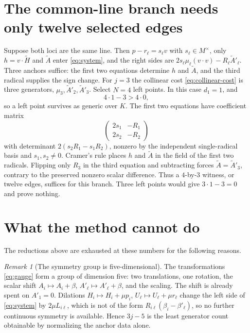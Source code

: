 \documentclass[11pt]{article}
\theoremstyle{remark}
\newtheorem{remark}{Remark}
\begin{document}
\section{The common-line branch needs only twelve selected edges}
\label{sec:common-line}
Suppose both loci are the same line. Then $p-r_\ell=s_\ell v$ with
$s_\ell\in M^\times$, only $h=v\cdot\widetilde H$ and $\widetilde A$
enter \eqref{eq:system}, and the right sides are
$2s_\ell\mu_\ell(v\cdot v)-R_\ell\widetilde A'_\ell$. Three anchors
suffice: the first two equations determine $h$ and $\widetilde A$, and
the third radical supplies the sign change. For $j=3$ the collinear
cost \eqref{eq:collinear-cost} is three generators,
$\mu_3,\widetilde A'_2,\widetilde A'_3$. Select $N=4$ left points. In
this case $d_1=1$, and
\[
 4\cdot1-3>4\cdot0 ,
\]
so a left point survives as generic over $K$. The first two equations
have coefficient matrix
\[
 \begin{pmatrix}2s_1&-R_1\\2s_2&-R_2\end{pmatrix}
\]
with determinant $2(s_2R_1-s_1R_2)$, nonzero by the independent
single-radical basis and $s_1,s_2\ne0$. Cramer's rule places $h$ and
$\widetilde A$ in the field of the first two radicals. Flipping only
$R_3$ in the third equation and subtracting forces
$\widetilde A=\widetilde A'_3$, contrary to the preserved nonzero
scalar difference. Thus a $4$-by-$3$ witness, or twelve edges, suffices
for this branch. Three left points would give $3\cdot1-3=0$ and prove
nothing.

\section{What the method cannot do}
\label{sec:limits}
The reductions above are exhausted at these numbers for the following
reasons.

\begin{remark}[The symmetry group is five-dimensional]
The transformations \eqref{eq:gauge} form a group of dimension five:
two translations, one rotation, the scalar shift
$A_i\mapsto A_i+\beta$, $A'_\ell\mapsto A'_\ell+\beta$, and the
scaling. The shift is already spent on $A'_1=0$. Dilations
$H_i\mapsto H_i+\mu p_i$, $U_\ell\mapsto U_\ell+\mu r_\ell$ change the
left side of \eqref{eq:system} by $2\mu L_{i\ell}$, which is not of
the form $R_{i\ell}(\beta_i-\beta'_\ell)$, so no further continuous
symmetry is available. Hence $3j-5$ is the least generator count
obtainable by normalizing the anchor data alone.
\end{remark}
\end{document}
